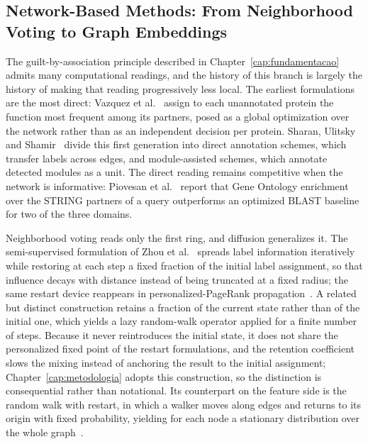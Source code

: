 \documentclass[Ingles]{ic-tese-v3}
\begin{document}
\subsection{Network-Based Methods: From Neighborhood Voting to Graph Embeddings}
\label{sec:rel_redes}

The guilt-by-association principle described in Chapter~\ref{cap:fundamentacao} admits many computational
readings, and the history of this branch is largely the history of making that reading progressively
less local. The earliest formulations are the most direct: Vazquez et al.~\cite{vazquez_global_2003}
assign to each unannotated protein the function most frequent among its partners, posed as a global
optimization over the network rather than as an independent decision per protein. Sharan, Ulitsky and
Shamir~\cite{sharan2007network} divide this first generation into direct annotation schemes, which
transfer labels across edges, and module-assisted schemes, which annotate detected modules as a unit.
The direct reading remains competitive when the network is informative:
Piovesan et al.~\cite{piovesan2015protein} report that Gene Ontology enrichment over the STRING
partners of a query outperforms an optimized BLAST baseline for two of the three domains.

Neighborhood voting reads only the first ring, and diffusion generalizes it. The semi-supervised
formulation of Zhou et al.~\cite{zhou2004learning} spreads label information iteratively while
restoring at each step a fixed fraction of the initial label assignment, so that influence decays
with distance instead of being truncated at a fixed radius; the same restart device reappears in
personalized-PageRank propagation~\cite{klicpera2019predict}. A related but distinct construction
retains a fraction of the current state rather than of the initial one, which yields a lazy
random-walk operator applied for a finite number of steps. Because it never reintroduces the initial
state, it does not share the personalized fixed point of the restart formulations, and the retention
coefficient slows the mixing instead of anchoring the result to the initial assignment;
Chapter~\ref{cap:metodologia} adopts this construction, so the distinction is consequential rather
than notational. Its counterpart on the feature side is the random walk with restart, in which a
walker moves along edges and returns to its origin with fixed probability, yielding for each node a
stationary distribution over the whole graph~\cite{tong2006fast}.
\end{document}

